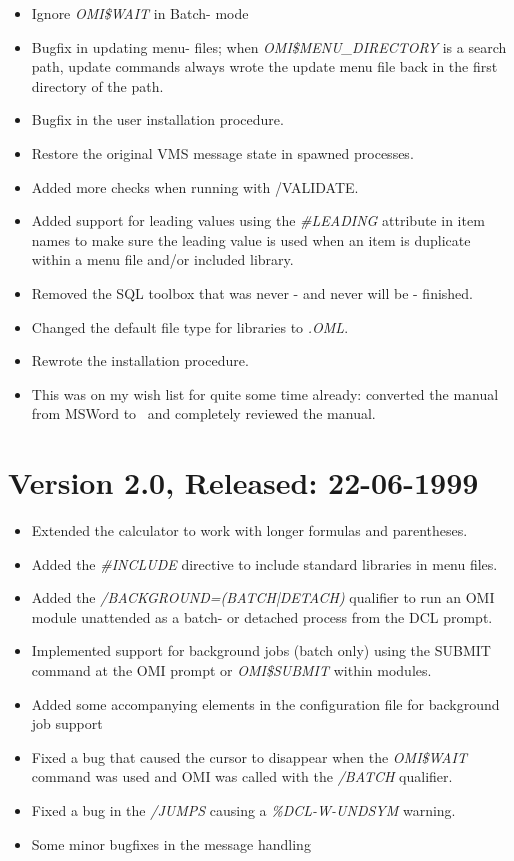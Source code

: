 \documentclass[a4paper]{book}
\begin{document}
\begin{itemize}
\item Ignore \textsl{OMI{\$}WAIT} in Batch- mode
\item Bugfix in updating menu- files; when \textsl{OMI{\$}MENU{\_}DIRECTORY} is a search path, update commands always wrote the update menu file back in the first directory of the path.
\item Bugfix in the user installation procedure.
\item Restore the original VMS message state in spawned processes.
\item Added more checks when running with \textsf{/VALIDATE}.
\item Added support for leading values using the \textsl{{\#}LEADING} attribute in item names to make sure the leading value is used when an item is duplicate within a menu file and/or included library.
\item Removed the SQL toolbox that was never - and never will be - finished.
\item Changed the default file type for libraries to \textsl{.OML}.
\item Rewrote the installation procedure.
\item This was on my wish list for quite some time already: converted the manual from MSWord to \LaTeXe\, and completely reviewed the manual.
\end{itemize}

\section*{Version 2.0, Released: 22-06-1999}

\begin{itemize}
\item Extended the calculator to work with longer formulas and parentheses.
\item Added the \textsl{{\#}INCLUDE} directive to include standard libraries in menu files.
\item Added the \textsl{/BACKGROUND=(BATCH|DETACH)} qualifier to run an OMI module unattended as a batch- or detached process from the DCL prompt.
\item Implemented support for background jobs (batch only) using the \textsf{SUBMIT} command at the OMI prompt or \textsl{OMI{\$}SUBMIT} within modules.
\item Added some accompanying elements in the configuration file for background job support
\item Fixed a bug that caused the cursor to disappear when the \textsl{OMI{\$}WAIT }command was used and OMI was called with the \textsl{/BATCH} qualifier.
\item Fixed a bug in the \textsl{/JUMPS} causing a \textsl{\%DCL-W-UNDSYM} warning.
\item Some minor bugfixes in the message handling
\end{itemize}
\end{document}

